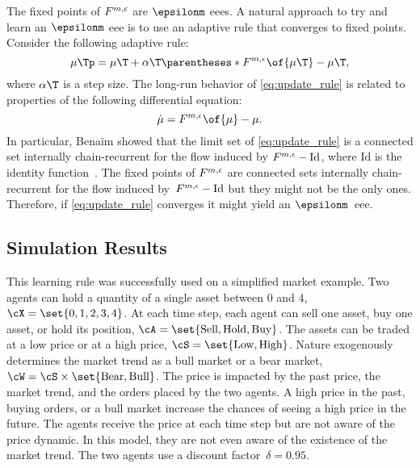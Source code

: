 The fixed points of \(F^{m, \epsilon}\) are \(\epsilonm\) \acp{eee}.
A natural approach to try and learn an \(\epsilonm\) \ac{eee} is to use an adaptive rule that converges to fixed points.
Consider the following adaptive rule:
\begin{equation}
\label{eq:update_rule}
\mu\Tp = \mu\T + \alpha\T \parentheses*{\FF \of{\mu\T} - \mu\T},
\end{equation}
where \(\alpha\T\) is a step size.
The long-run behavior of \cref{eq:update_rule} is related to properties of the following differential equation:
\begin{equation*}
\label{eq:differential_equation}
\dot{\mu} = \FF \of{\mu} - \mu.
\end{equation*}
In particular, Benaïm showed that the limit set of \cref{eq:update_rule} is a connected set internally chain-recurrent for the flow induced by \(F^{m, \epsilon} - \text{Id}\), where \(\text{Id}\) is the identity function~\cite{benaim:1996}.
The fixed points of \(F^{m, \epsilon}\) are connected sets internally chain-recurrent for the flow induced by~\(F^{m, \epsilon} - \text{Id}\) but they might not be the only ones.
Therefore, if \cref{eq:update_rule} converges it might yield an \(\epsilonm\)~\ac{eee}.

\subsection{Simulation Results}
This learning rule was successfully used on a simplified market example.
Two agents can hold a quantity of a single asset between \(0\) and \(4\), \(\cX = \set{0,1,2,3,4}\).
At each time step, each agent can sell one asset, buy one asset, or hold its position, \(\cA = \set{\text{Sell}, \text{Hold}, \text{Buy}}\).
The assets can be traded at a low price or at a high price, \(\cS=\set{\text{Low}, \text{High}}\).
Nature exogenously determines the market trend as a bull market or a bear market, \(\cW=\cS \times \set{\text{Bear}, \text{Bull}}\).
The price is impacted by the past price, the market trend, and the orders placed by the two agents.
A high price in the past, buying orders, or a bull market increase the chances of seeing a high price in the future.
The agents receive the price at each time step but are not aware of the price dynamic.
In this model, they are not even aware of the existence of the market trend.
The two agents use a discount factor~\(\delta=0.95\).

